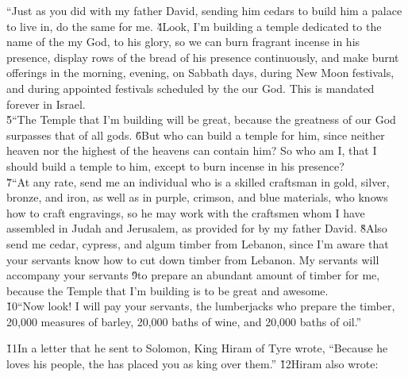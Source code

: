 \begin{poetry}
\poeml ``Just as you did with my father David, sending him cedars to build him a palace to live in, do the same for me. \v{4}Look, I'm building a temple dedicated to the name of the  my God, to his glory, so we can burn fragrant incense in his presence, display rows of the bread of his presence continuously, and make burnt offerings in the morning, evening, on Sabbath days, during New Moon festivals, and during appointed festivals scheduled by the  our God. This is mandated forever in Israel. \\
\poeml \v{5}``The Temple that I'm building will be great, because the greatness of our God surpasses that of all gods. \v{6}But who can build a temple for him, since neither heaven nor the highest of the heavens can contain him? So who am I, that I should build a temple to him, except to burn incense in his presence? \\
\poeml \v{7}``At any rate, send me an individual who is a skilled craftsman in gold, silver, bronze, and iron, as well as in purple, crimson, and blue materials, who knows how to craft engravings, so he may work with the craftsmen whom I have assembled in Judah and Jerusalem, as provided for by my father David. \v{8}Also send me cedar, cypress, and algum timber from Lebanon, since I'm aware that your servants know how to cut down timber from Lebanon. My servants will accompany your servants \v{9}to prepare an abundant amount of timber for me, because the Temple that I'm building is to be great and awesome. \\
\poeml \v{10}``Now look! I will pay your servants, the lumberjacks who prepare the timber, 20,000 measures of barley, 20,000 baths of wine, and 20,000 baths of oil.''
\end{poetry}

\v{11}In a letter that he sent to Solomon, King Hiram of Tyre wrote, ``Because he loves his people, the  has placed you as king over them.'' \v{12}Hiram also wrote:

